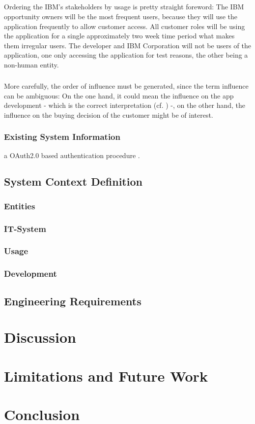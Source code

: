 \paragraph{}
Ordering the IBM's stakeholders by usage is pretty straight foreword: The IBM opportunity owners will be the most frequent users, because they will use the application frequently to allow customer access. All customer roles will be using the application for a single approximately two week time period what makes them irregular users.
The developer and IBM Corporation will not be users of the application, one only accessing the application for test reasons, the other being a non-human entity. 

\paragraph{} More carefully, the order of influence must be generated, since the term influence can be ambiguous: On the one hand, it could mean the influence on the app development - which is the correct interpretation (cf. \Cref{}) -, on the other hand, the influence on the buying decision of the customer might be of interest.



\subsection{Existing System Information}
 a OAuth2.0 \parencite[cf.][]{InternetEngineeringTaskForce.2012} based authentication procedure .

\section{System Context Definition}
\subsection{Entities}

\subsection{IT-System}

\subsection{Usage}

\subsection{Development}


\section{Engineering Requirements}


\chapter{Discussion}


\chapter{Limitations and Future Work}


\chapter{Conclusion}